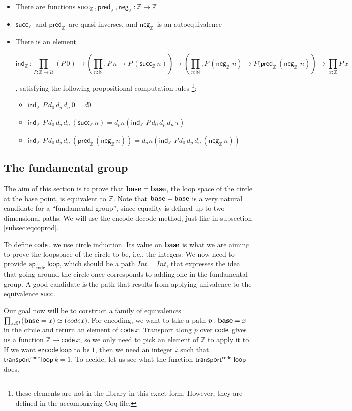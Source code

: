 \documentclass[12 pt]{amsart}
\theoremstyle{definition}
\theoremstyle{remark}
\newcommand{\Type}{\mathcal{U}}
\newcommand{\base}{\mathsf{\bf base}}
\newcommand{\C}{{\mathbb{S}^1}}
\newcommand{\lo}{\mathsf{ loop}}
\newcommand{\trans}{\mathsf{transport}}
\newcommand{\ap}{\mathsf{ap}}
\newcommand{\code}{{\mathsf{ code}\,}}
\newcommand{\encode}{{\mathsf{ encode}\,}}
\newcommand{\suc}{\mathsf{succ}}
\newcommand{\nat}{{\mathbb{N}}}
\newcommand{\intg}{{\mathbb{Z}}}
\newcommand{\intneg}{\mathsf{neg}_\intg\,}
\newcommand{\intpred}{\mathsf{pred}_\intg\,}
\newcommand{\intsucc}{\mathsf{succ}_\intg\,}
\newcommand{\intind}{\mathsf{ind}_\intg\,}
\begin{document}
\begin{itemize}
\item There are functions $\intsucc, \intpred, \intneg : \intg\to\intg$
\item $\intsucc$ and $\intpred$ are quasi inverses, and $\intneg$ is an autoequivalence
\item There is an element 
\begin{small}
\[\intind : \prod_ {P : \intg \to \Type}
(P\,0) \to
\left(\prod_{ n :\nat}, P \,n \to P\, (\intsucc n)\right) \to
\left(\prod_ {n : \nat}, P\, (\intneg \,n) \to P ( \intpred (\intneg \, n)\right) \to \prod_{ x : \intg} P\,x\] 
\end{small}
\cite[Lemma 6.10.12]{hottbook}, satisfying the following propositional computation rules \footnote{these elements are not in the library in this exact form. However, they are defined in the accompanying Coq file.}:
\begin{itemize}
\item $\intind\, P\, d_0\, d_p\, d_n \,0 = d0$
 \item $\intind\, P \,d_0 \,d_p\, d_n\, (\intsucc n) = d_p n (\intind\, P \,d_0\, d_p\, d_n\,  n)$
\item $\intind\, P \,d_0 \,d_p\, d_n\, (\intpred (\intneg n)) = d_n n (\intind\, P \,d_0\, d_p\, d_n\, (\intneg n))$
\end{itemize}
\end{itemize}


\subsection{The fundamental group}
The aim of this section is to prove that $\base = \base$, the loop space of the circle at the base point, is equivalent to $\mathbb{Z}$. Note that $\base = \base$ is a very natural candidate for a ``fundamental group'', since equality is defined up to two-dimensional paths.  We will use the encode-decode method, just like in subsection \ref{subsec:eqcoprod}.

To define $\code$, we use circle induction. Its value on $\base$ is what we are aiming to prove the loopspace of the circle to be, i.e., the integers. We now need to provide $\ap_\code\,\lo$, which should be a path $Int = Int$, that expresses the idea that going around the circle once corresponds to adding one in the fundamental group. A good candidate is the path that results from applying univalence to the equivalence $\suc$.

Our goal now will be to construct a family of equivalences $\prod_{x : \C} (\base = x) \simeq (code x)$. For encoding, we want to take a path $p : \base = x$ in the circle and return an element of $\code x$. Transport along $p$ over $\code$ gives us a function $\mathbb{Z} \to \code x$, so we only need to pick an element of $\mathbb{Z}$ to apply it to. If we want $\encode \lo$ to be $1$, then we need an integer $k$ such that $\trans^{\code} \lo\,k = 1$. To decide, let us see what the function $\trans^{\code}\, \lo $ does.
\end{document}
